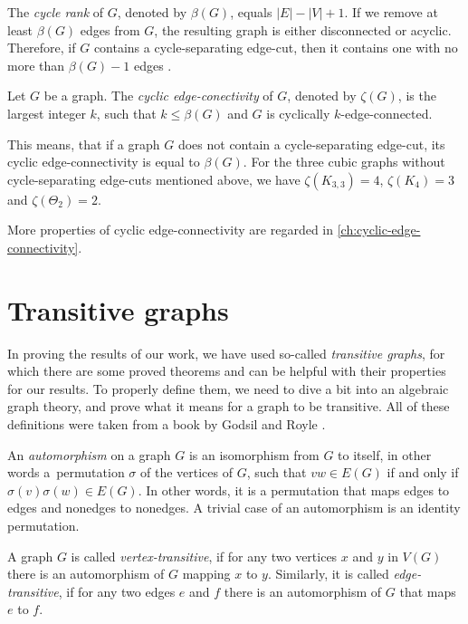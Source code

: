\documentclass[12pt, twoside]{book}
\begin{document}
The \textit{cycle rank} of $G$, denoted by $\beta(G)$, equals $|E|-|V|+1$. If we remove at least $\beta(G)$ edges from $G$, the resulting graph is either disconnected or acyclic. Therefore, if $G$ contains a cycle-separating edge-cut, then it contains one with no more than $\beta(G)-1$ edges \cite{atoms-of-cyclic}.

\begin{definition}
	Let $G$ be a graph. The \textit{cyclic edge-conectivity} of $G$, denoted by $\zeta(G)$, is the largest integer $k$, such that $k\leq \beta(G)$ and $G$ is cyclically $k$-edge-connected.
\end{definition}

This means, that if a graph $G$ does not contain a cycle-separating edge-cut, its cyclic edge-connectivity is equal to $\beta(G)$. For the three cubic graphs without cycle-separating edge-cuts mentioned above, we have $\zeta(K_{3,3})=4$, $\zeta(K_4)=3$ and $\zeta(\Theta_2)=2$.

More properties of cyclic edge-connectivity are regarded in \cref{ch:cyclic-edge-connectivity}.

\section{Transitive graphs}

In proving the results of our work, we have used so-called \textit{transitive graphs}, for which there are some proved theorems and can be helpful with their properties for our results. To properly define them, we need to dive a bit into an algebraic graph theory, and prove what it means for a graph to be transitive. All of these definitions were taken from a book by Godsil and Royle \cite{algebraic-graph-theory}.

An \textit{automorphism} on a graph $G$ is an isomorphism from $G$ to itself, in other words a~permutation $\sigma$ of the vertices of $G$, such that $vw\in E(G)$ if and only if $\sigma(v)\sigma(w)\in E(G)$. In other words, it is a permutation that maps edges to edges and nonedges to nonedges. A trivial case of an automorphism is an identity permutation.

A graph $G$ is called \emph{vertex-transitive}, if for any two vertices $x$ and $y$ in $V(G)$ there is an automorphism of $G$ mapping $x$ to $y$. Similarly, it is called \emph{edge-transitive}, if for any two edges $e$ and $f$ there is an automorphism of $G$ that maps $e$ to $f$.
\end{document}
